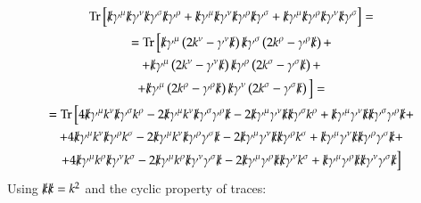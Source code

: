 \documentclass{article}
\begin{document}
\begin{equation}
\begin{gathered}
    \Tr \Big[
    \slashed{k}\gamma^\mu
    \slashed{k}\gamma^\nu
    \slashed{k}\gamma^\sigma
    \slashed{k}\gamma^\rho +
    \slashed{k}\gamma^\mu
    \slashed{k}\gamma^\nu
    \slashed{k}\gamma^\rho
    \slashed{k}\gamma^\sigma +
    \slashed{k}\gamma^\mu
    \slashed{k}\gamma^\rho
    \slashed{k}\gamma^\nu
    \slashed{k}\gamma^\sigma \Big] = \\ =
    \Tr \Big[
    \slashed{k}\gamma^\mu
    \left(2 k^\nu - \gamma^\nu \slashed{k}\right)
    \slashed{k}\gamma^\sigma
    \left(2 k^\rho - \gamma^\rho \slashed{k}\right) + \\ +
    \slashed{k}\gamma^\mu
    \left(2 k^\nu - \gamma^\nu \slashed{k}\right)
    \slashed{k}\gamma^\rho
    \left(2 k^\sigma - \gamma^\sigma \slashed{k}\right) + \\ +
    \slashed{k}\gamma^\mu
    \left(2 k^\rho - \gamma^\rho \slashed{k}\right)
    \slashed{k}\gamma^\nu
    \left(2 k^\sigma - \gamma^\sigma \slashed{k}\right) \Big] = \\ =
    \Tr \Big[
    4 \slashed{k}\gamma^\mu k^\nu\slashed{k}\gamma^\sigma k^\rho -
    2 \slashed{k}\gamma^\mu k^\nu\slashed{k}\gamma^\sigma \gamma^\rho \slashed{k} -
    2 \slashed{k}\gamma^\mu \gamma^\nu \slashed{k}\slashed{k}\gamma^\sigma k^\rho +
    \slashed{k}\gamma^\mu \gamma^\nu \slashed{k}\slashed{k}\gamma^\sigma \gamma^\rho \slashed{k} + \\ +
    4 \slashed{k}\gamma^\mu k^\nu \slashed{k}\gamma^\rho k^\sigma -
    2 \slashed{k}\gamma^\mu k^\nu \slashed{k}\gamma^\rho \gamma^\sigma \slashed{k} -
    2 \slashed{k}\gamma^\mu \gamma^\nu \slashed{k} \slashed{k}\gamma^\rho k^\sigma +
    \slashed{k}\gamma^\mu \gamma^\nu \slashed{k} \slashed{k}\gamma^\rho \gamma^\sigma \slashed{k} + \\ +
    4 \slashed{k}\gamma^\mu k^\rho \slashed{k}\gamma^\nu k^\sigma -
    2 \slashed{k}\gamma^\mu k^\rho \slashed{k}\gamma^\nu \gamma^\sigma \slashed{k} -
    2 \slashed{k}\gamma^\mu \gamma^\rho \slashed{k} \slashed{k}\gamma^\nu k^\sigma +
    \slashed{k}\gamma^\mu \gamma^\rho \slashed{k} \slashed{k}\gamma^\nu \gamma^\sigma \slashed{k} \Big]
\end{gathered}
\end{equation}
Using $\slashed{k}\slashed{k} = k^2$ and the cyclic property of traces:
\end{document}
